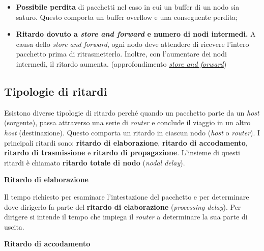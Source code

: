 \documentclass[a4paper]{article}
\begin{document}
	\begin{itemize}
		\item[\ding{55}] \textbf{Possibile perdita} di pacchetti nel caso in cui un buffer di un nodo sia saturo. Questo comporta un buffer overflow e una conseguente perdita;
		
		\item[\ding{55}] \textbf{Ritardo dovuto a \emph{store and forward} e numero di nodi intermedi.} A causa dello \emph{store and forward}, ogni nodo deve attendere di ricevere l'intero pacchetto prima di ritrasmetterlo. Inoltre, con l'aumentare dei nodi intermedi, il ritardo aumenta.\newline
		(approfondimento \href{https://it.wikipedia.org/wiki/Store_and_forward#:~:text=Nelle%20telecomunicazioni%2C%20lo%20store%20and,ritrasmesso%20nel%20collegamento%20in%20uscita}{\emph{store and forward}})
	\end{itemize}
	
	\newpage
	
	\subsection{Tipologie di ritardi}
	
	Esistono diverse tipologie di ritardo perché quando un pacchetto parte da un \emph{host} (sorgente), passa attraverso una serie di \emph{router} e conclude il viaggio in un altro \emph{host} (destinazione). Questo comporta un ritardo in ciascun nodo (\emph{host} o \emph{router}). I principali ritardi sono: \textbf{ritardo di elaborazione}, \textbf{ritardo di accodamento}, \textbf{ritardo di trasmissione} e \textbf{ritardo di propagazione}. L'insieme di questi ritardi è chiamato \textbf{ritardo totale di nodo} (\emph{nodal delay}).
	
	\begin{flushleft}
		\large \textcolor{Red3}{\textbf{Ritardo di elaborazione}}
	\end{flushleft}
	
	\noindent
	Il tempo richiesto per esaminare l’intestazione del pacchetto e per determinare dove dirigerlo fa parte del \textbf{ritardo di elaborazione} (\emph{processing delay}). Per dirigere si intende il tempo che impiega il \emph{router} a determinare la sua parte di uscita.
	
	\begin{flushleft}
		\large \textcolor{Red3}{\textbf{Ritardo di accodamento}}
	\end{flushleft}
	
\end{document}
